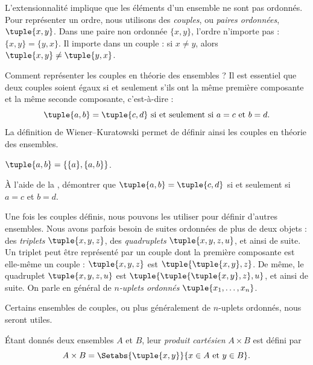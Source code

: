 \documentclass[../../../include/open-logic-section]{subfiles}
\begin{document}

\begin{explain}
L'extensionnalité implique que les éléments d'un ensemble ne
sont pas ordonnés. Pour représenter un ordre, nous utilisons
des \emph{couples}, ou \emph{paires ordonnées}, $\tuple{x, y}$.
Dans une paire non ordonnée $\{x, y\}$, l'ordre n'importe pas :
$\{x, y\} = \{y, x\}$. Il importe dans un couple :
si $x \neq y$, alors $\tuple{x, y} \neq \tuple{y, x}$.

Comment représenter les couples en théorie des ensembles ?
Il est essentiel que deux couples soient égaux si et seulement
s'ils ont la même première composante et la même seconde
composante, c'est-à-dire :
\[
  \tuple{a, b}= \tuple{c, d}\text{ si et seulement si }a = c \text{ et }b=d.
\]
La définition de Wiener--Kuratowski permet de définir ainsi
les couples en théorie des ensembles.
\end{explain}

\begin{defn}[Couple]
	$\tuple{a, b} = \{\{a\}, \{a, b\}\}$.
\end{defn}

\begin{prob}
	À l'aide de la ,
	démontrer que $\tuple{a, b}= \tuple{c, d}$ si et seulement si
	$a = c$ et $b=d$.
\end{prob}

\begin{explain}
Une fois les couples définis, nous pouvons les utiliser pour
définir d'autres ensembles. Nous avons parfois besoin de suites
ordonnées de plus de deux objets : des \emph{triplets}
$\tuple{x, y, z}$, des \emph{quadruplets} $\tuple{x, y, z, u}$,
et ainsi de suite. Un triplet peut être représenté par un couple
dont la première composante est elle-même un couple :
$\tuple{x, y, z}$ est $\tuple{\tuple{x, y},z}$.
De même, le quadruplet $\tuple{x,y,z,u}$ est
$\tuple{\tuple{\tuple{x,y},z},u}$, et ainsi de suite.
On parle en général de \emph{$n$-uplets ordonnés}
$\tuple{x_1, \dots, x_n}$.

Certains ensembles de couples, ou plus généralement de
$n$-uplets ordonnés, nous seront utiles.
\end{explain}

\begin{defn}
Étant donnés deux ensembles $A$ et $B$, leur \emph{produit cartésien}
$A \times B$ est défini par
\[
  A \times B = \Setabs{\tuple{x, y}}{x \in A \text{ et } y \in B}.
\]
\end{defn}
\end{document}
